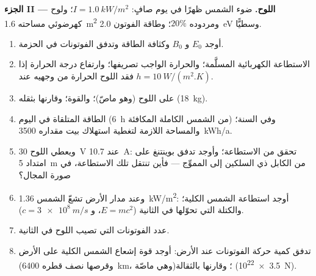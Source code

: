 \begin{problem}
\medskip
\noindent\textbf{الجزء II --- اللوح.}
ضوء الشمس ظهرًا في يوم صافٍ: $I = \qty{1.0}{kW/m^2}$؛ ولوح
كهرضوئي مساحته \qty{1.6}{m^2} ومردوده $20\%$؛ وطاقة الفوتون \qty{2.0}{eV}
وسطيًّا.
\begin{enumerate}[resume]
  \item أوجد $E_0$ و $B_0$ وكثافة الطاقة وتدفق الفوتونات في الحزمة.
  \item الاستطاعة الكهربائية المسلَّمة؛ والحرارة الواجب تصريفها؛ وارتفاع
        درجة الحرارة إذا فقد اللوح الحرارة من وجهيه عند $h = \qty{10}{W/(m^2.K)}$.
  \item {} على اللوح (وهو ماصّ)؛ والقوة؛ وقارنها
        بثقله (\qty{18}{kg}).
  \item الطاقة المتلقاة في اليوم (\qty{6}{h} من الشمس الكاملة المكافئة) وفي
        السنة؛ والمساحة اللازمة لتغطية استهلاك بيت مقداره
        \qty{3500}{kWh/a}.
  \item ويعطي اللوح \qty{30}{V} عند \qty{10.7}{A}: تحقق من الاستطاعة؛
        وأوجد تدفق بوينتنغ على امتداد \qty{5}{m} من الكابل ذي السلكين إلى
        المموِّج --- فأين تنتقل تلك الاستطاعة، في صورة
        المجال؟
  \item وعند مدار الأرض تشعّ الشمس \qty{1.36}{kW/m^2}: أوجد استطاعة
        الشمس الكلية؛ والكتلة التي تحوّلها في الثانية ($E = mc^2$،
        و $c = \qty{3e8}{m/s}$).
  \item عدد الفوتونات التي تصيب اللوح في الثانية.
  \item تدفق كمية حركة الفوتونات عند الأرض: أوجد قوة إشعاع
        الشمس الكلية على الأرض (وقرصها نصف قطره \qty{6400}{km}، وهي ماصّة)؛
        وقارنها بالثقالة (\qty{3.5e22}{N}).
\end{enumerate}


\end{problem}
